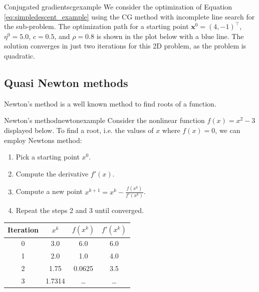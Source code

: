 \begin{example}{Conjugated gradients}{cgexample}
    We consider the optimization of Equation \eqref{eq:simpledescent_example} using the CG method with incomplete line search for the sub-problem. The optimization path for a starting point $\mathbf{x}^0= (4, -1)^\top$, $\eta^0=5.0$, $c=0.5$, and $\rho=0.8$ is shown in the plot below with a blue line. The solution converges in just two iterations for this 2D problem, as the problem is quadratic.
    \begin{center}
        
    \end{center}   
\end{example}

\subsection{Quasi Newton methods}
Newton's method is a well known method to find roots of a function. 

\begin{example}{Newton's method}{newtonexample}
    Consider the nonlinear function $f(x) = x^2 - 3$ displayed below. To find a root, i.e. the values of $x$ where $f(x)=0$, we can employ Newtons method: 
    \begin{enumerate}
        \item Pick a starting point $x^0$.
        \item Compute the derivative $f'(x)$.
        \item Compute a new point $x^{k+1} = x^k - \frac{f(x^k)}{f'(x^k)}$.
        \item Repeat the steps 2 and 3 until converged.
    \end{enumerate}
    
    
    \begin{center}    
        \begin{tabular}{cccc}
    
             Iteration  & $x^k$     & $f(x^k)$  & $f'(x^k)$\\
             \hline
             0          & 3.0       & 6.0       & 6.0\\
             1          & 2.0       & 1.0       & 4.0\\
             2          & 1.75      & 0.0625    & 3.5\\
             3          & 1.7314    & \dots     & \dots\\
        \end{tabular}
    \end{center}
\end{example}


